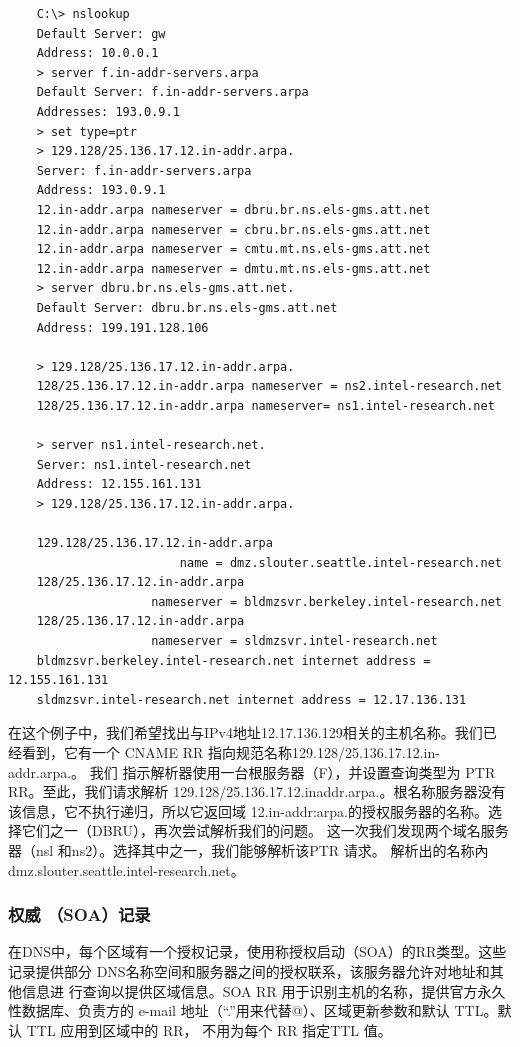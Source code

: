 \begin{verbatim}
    C:\> nslookup
    Default Server: gw
    Address: 10.0.0.1
    > server f.in-addr-servers.arpa
    Default Server: f.in-addr-servers.arpa
    Addresses: 193.0.9.1
    > set type=ptr
    > 129.128/25.136.17.12.in-addr.arpa.
    Server: f.in-addr-servers.arpa
    Address: 193.0.9.1
    12.in-addr.arpa nameserver = dbru.br.ns.els-gms.att.net
    12.in-addr.arpa nameserver = cbru.br.ns.els-gms.att.net
    12.in-addr.arpa nameserver = cmtu.mt.ns.els-gms.att.net
    12.in-addr.arpa nameserver = dmtu.mt.ns.els-gms.att.net
    > server dbru.br.ns.els-gms.att.net.
    Default Server: dbru.br.ns.els-gms.att.net
    Address: 199.191.128.106

    > 129.128/25.136.17.12.in-addr.arpa.
    128/25.136.17.12.in-addr.arpa nameserver = ns2.intel-research.net
    128/25.136.17.12.in-addr.arpa nameserver= ns1.intel-research.net

    > server ns1.intel-research.net.
    Server: ns1.intel-research.net
    Address: 12.155.161.131
    > 129.128/25.136.17.12.in-addr.arpa.

    129.128/25.136.17.12.in-addr.arpa
                        name = dmz.slouter.seattle.intel-research.net
    128/25.136.17.12.in-addr.arpa
                    nameserver = bldmzsvr.berkeley.intel-research.net
    128/25.136.17.12.in-addr.arpa
                    nameserver = sldmzsvr.intel-research.net
    bldmzsvr.berkeley.intel-research.net internet address = 12.155.161.131
    sldmzsvr.intel-research.net internet address = 12.17.136.131
\end{verbatim}

在这个例子中，我们希望找出与IPv4地址12.17.136.129相关的主机名称。我们已
经看到，它有一个 CNAME RR 指向规范名称129.128/25.136.17.12.in-addr.arpa.。 我们
指示解析器使用一台根服务器（F），并设置查询类型为 PTR RR。至此，我们请求解析
129.128/25.136.17.12.inaddr.arpa.。根名称服务器没有该信息，它不执行递归，所以它返回域
12.in-addr:arpa.的授权服务器的名称。选择它们之一（DBRU），再次尝试解析我们的问题。
这一次我们发现两个域名服务器（nsl 和ns2）。选择其中之一，我们能够解析该PTR 请求。
解析出的名称內 dmz.slouter.seattle.intel-research.net。

\subsubsection{权威 （SOA）记录}

在DNS中，每个区域有一个授权记录，使用称授权启动（SOA）的RR类型。这些
记录提供部分 DNS名称空间和服务器之间的授权联系，该服务器允许对地址和其他信息进
行查询以提供区域信息。SOA RR 用于识别主机的名称，提供官方永久性数据库、负责方的
e-mail 地址（“.”用来代替@）、区域更新参数和默认 TTL。默认 TTL 应用到区域中的 RR，
不用为每个 RR 指定TTL 值。

